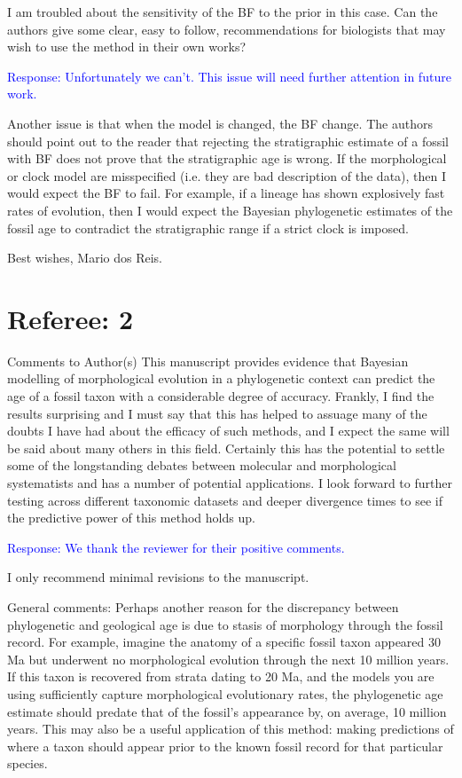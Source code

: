 \documentclass[11pt]{article}
\newcommand{\response}[1]{\medskip{}\textcolor{blue}{{Response: #1}}\medskip{}}
\begin{document}
I am troubled about the sensitivity of the BF to the prior in this case. Can the authors give some clear, easy to follow, recommendations for biologists that may wish to use the method in their own works? 

\response{Unfortunately we can't. This issue will need further attention in future work.}

Another issue is that when the model is changed, the BF change. The authors should point out to the reader that rejecting the stratigraphic estimate of a fossil with BF does not prove that the stratigraphic age is wrong. If the morphological or clock model are misspecified (i.e. they are  bad description of the data), then I would expect the BF to fail. For example, if a lineage has shown explosively fast rates of evolution, then I would expect the Bayesian phylogenetic estimates of the fossil age to contradict the stratigraphic range if a strict clock is imposed.

Best wishes,
Mario dos Reis.

\section*{Referee: 2}

Comments to Author(s)
This manuscript provides evidence that Bayesian modelling of morphological evolution in a phylogenetic context can predict the age of a fossil taxon with a considerable degree of accuracy. Frankly, I find the results surprising and I must say that this has helped to assuage many of the doubts I have had about the efficacy of such methods, and I expect the same will be said about many others in this field. Certainly this has the potential to settle some of the longstanding debates between molecular and morphological systematists and has a number of potential applications. I look forward to further testing across different taxonomic datasets and deeper divergence times to see if the predictive power of this method holds up. 

\response{We thank the reviewer for their positive comments.}

I only recommend minimal revisions to the manuscript.

General comments:
Perhaps another reason for the discrepancy between phylogenetic and geological age is due to stasis of morphology through the fossil record. For example, imagine the anatomy of a specific fossil taxon appeared 30 Ma but underwent no morphological evolution through the next 10 million years. If this taxon is recovered from strata dating to 20 Ma, and the models you are using sufficiently capture morphological evolutionary rates, the phylogenetic age estimate should predate that of the fossil's appearance by, on average, 10 million years. This may also be a useful application of this method: making predictions of where a taxon should appear prior to the known fossil record for that particular species.
\end{document}
